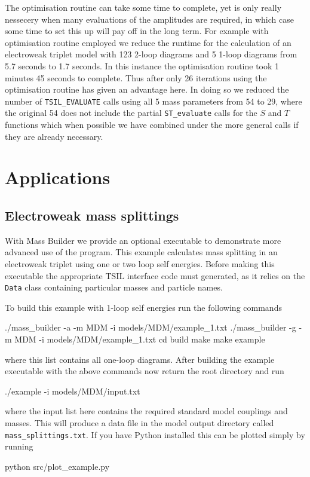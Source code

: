 The optimisation routine can take some time to complete, yet is only really nessecery when many evaluations of the amplitudes are required, in which case some time to set this up will pay off in the long term.  For example with optimisation routine employed we reduce the runtime for the calculation of an electroweak triplet model with 123 2-loop diagrams and 5 1-loop diagrams from 5.7 seconds to 1.7 seconds.  In this instance the optimisation routine took 1 minutes 45 seconds to complete.  Thus after only 26 iterations using the optimisation routine has given an advantage here.  In doing so we reduced the number of \lstinline{TSIL_EVALUATE} calls using all 5 mass parameters from 54 to 29, where the original 54 does not include the partial \lstinline{ST_evaluate} calls for the $S$ and $T$ functions which when possible we have combined under the more general calls if they are already necessary.


\section{Applications}

\subsection{Electroweak mass splittings}

With Mass Builder we provide an optional executable to demonstrate more advanced use of the program.  This example calculates mass splitting in an electroweak triplet using one or two loop self energies.  Before making this executable the appropriate TSIL interface code must generated, as it relies on the \lstinline{Data} class containing particular masses and particle names.

To build this example with 1-loop self energies run the following commands
\begin{lstterm}
./mass_builder -a -m MDM -i models/MDM/example_1.txt
./mass_builder -g -m MDM -i models/MDM/example_1.txt
cd build
make
make example
\end{lstterm}
where this list contains all one-loop diagrams.  After building the example executable with the above commands now return the root directory and run
\begin{lstterm}
./example -i models/MDM/input.txt
\end{lstterm}
where the input list here contains the required standard model couplings and masses.  This will produce a data file in the model output directory called \lstinline{mass_splittings.txt}.  If you have Python installed this can be plotted simply by running
\begin{lstterm}
python src/plot_example.py
\end{lstterm}

